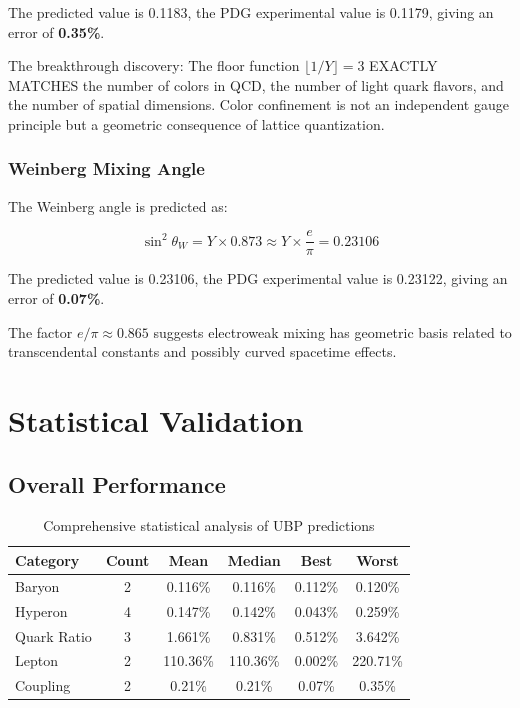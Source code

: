 \documentclass[11pt]{article}
\begin{document}
The predicted value is 0.1183, the PDG experimental value is 0.1179, giving an error of \textbf{0.35\%}.

The breakthrough discovery: The floor function $\lfloor 1/Y \rfloor = 3$ EXACTLY MATCHES the number of colors in QCD, the number of light quark flavors, and the number of spatial dimensions. Color confinement is not an independent gauge principle but a geometric consequence of lattice quantization.

\subsubsection{Weinberg Mixing Angle}

The Weinberg angle is predicted as:

\begin{equation}
\sin^2\theta_W = Y \times 0.873 \approx Y \times \frac{e}{\pi} = 0.23106
\end{equation}

The predicted value is 0.23106, the PDG experimental value is 0.23122, giving an error of \textbf{0.07\%}.

The factor $e/\pi \approx 0.865$ suggests electroweak mixing has geometric basis related to transcendental constants and possibly curved spacetime effects.

\section{Statistical Validation}

\subsection{Overall Performance}

\begin{table}[H]
\centering
\caption{Comprehensive statistical analysis of UBP predictions}
\begin{tabular}{lccccc}
\toprule
\textbf{Category} & \textbf{Count} & \textbf{Mean} & \textbf{Median} & \textbf{Best} & \textbf{Worst} \\
\midrule
Baryon & 2 & 0.116\% & 0.116\% & 0.112\% & 0.120\% \\
Hyperon & 4 & 0.147\% & 0.142\% & 0.043\% & 0.259\% \\
Quark Ratio & 3 & 1.661\% & 0.831\% & 0.512\% & 3.642\% \\
Lepton & 2 & 110.36\% & 110.36\% & 0.002\% & 220.71\% \\
Coupling & 2 & 0.21\% & 0.21\% & 0.07\% & 0.35\% \\
\bottomrule
\end{tabular}
\end{table}
\end{document}
